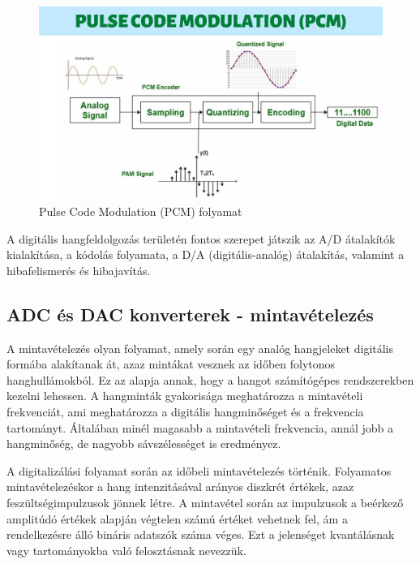 \begin{figure}[H]
	\centering
	\includegraphics[width=\linewidth, keepaspectratio]{figures/pulse _code_modulation.jpg}
	\caption{Pulse Code Modulation (PCM) folyamat~\cite{PULSECODEMODULATION}}\label{fig:pcm}
\end{figure}
A digitális hangfeldolgozás területén fontos szerepet játszik az A/D átalakítók kialakítása, 
a kódolás folyamata, a D/A (digitális-analóg) átalakítás, valamint a hibafelismerés és hibajavítás.
\subsection{ADC és DAC konverterek - mintavételezés}
A mintavételezés olyan folyamat, amely során egy analóg hangjeleket digitális formába alakítanak át, azaz mintákat vesznek az időben folytonos hanghullámokból. 
Ez az alapja annak, hogy a hangot számítógépes rendszerekben kezelni lehessen. A hangminták gyakorisága meghatározza a mintavételi frekvenciát, 
ami meghatározza a digitális hangminőséget és a frekvencia tartományt. Általában minél magasabb a mintavételi frekvencia, annál jobb a hangminőség, 
de nagyobb sávszélességet is eredményez.

A digitalizálási folyamat során az időbeli mintavételezés történik. 
Folyamatos mintavételezéskor a hang intenzitásával arányos diszkrét értékek, azaz feszültségimpulzusok jönnek létre. 
A mintavétel során az impulzusok a beérkező amplitúdó értékek alapján végtelen számú értéket vehetnek fel, 
ám a rendelkezésre álló bináris adatszók száma véges. Ezt a jelenséget kvantálásnak vagy tartományokba 
való felosztásnak nevezzük.

